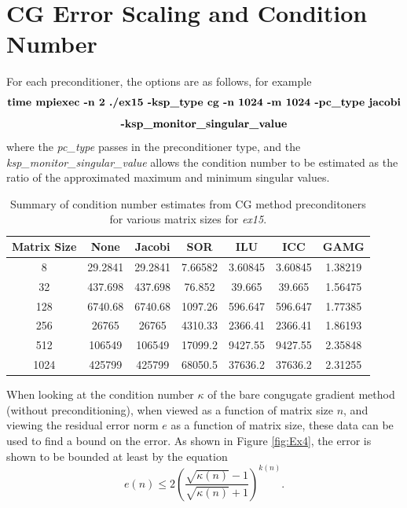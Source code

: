 \documentclass[12pt,letterpaper]{article}
\newcommand{\cmd}[1]{$$\textrm{\textbf{#1}}$$}
\newcommand{\program}{\textit{ex15}}
\begin{document}
\section{CG Error Scaling and Condition Number}

For each preconditioner, the options are as follows, for example \cmd{time mpiexec -n 2 ./ex15 -ksp\_type cg -n 1024 -m 1024 -pc\_type jacobi} \cmd{-ksp\_monitor\_singular\_value}
where the \textit{pc\_type} passes in the preconditioner type, and the \textit{ksp\_monitor\_singular\_value} allows the condition number to be estimated as the ratio of the approximated maximum and minimum singular values.


\begin{table}[htb!]
    \centering
    \caption{Summary of condition number estimates from CG method preconditoners for various matrix sizes for \program.}
    \label{tab:Ex3b_cg}
    \begin{tabular}{|c|c|c|c|c|c|c|} \hline
        Matrix Size & None & Jacobi & SOR & ILU & ICC & GAMG \\ \hline
        8   &   29.2841  & 29.2841 & 7.66582 & 3.60845 & 3.60845 & 1.38219 \\ \hline
        32  &    437.698  & 437.698 &  76.852 &  39.665 &  39.665 & 1.56475 \\ \hline
        128 &    6740.68  & 6740.68 & 1097.26 & 596.647 & 596.647 & 1.77385 \\ \hline
        256 &    26765    & 26765 & 4310.33 & 2366.41 & 2366.41 & 1.86193 \\ \hline
        512 &   106549   &    106549 &  17099.2 &  9427.55 &  9427.55 &   2.35848 \\ \hline
        1024 &   425799  &  425799 & 68050.5 & 37636.2 & 37636.2 & 2.31255 \\ \hline
    \end{tabular}
\end{table}


When looking at the condition number $\kappa$ of the bare congugate gradient method (without preconditioning), when viewed as a function of matrix size $n$, and viewing the residual error norm $e$ as a function of matrix size, these data can be used to find a bound on the error. As shown in Figure \ref{fig:Ex4}, the error is shown to be bounded at least by the equation
$$ e(n) \leq 2\left(\frac{\sqrt{\kappa(n)}-1}{\sqrt{\kappa(n)}+1}\right)^{k(n)}.$$
\end{document}
